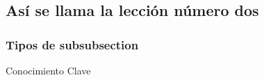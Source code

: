 \subsection{As\'i se llama la lección número dos}


\begin{opening}\blindtext\end{opening}
\subsubsection{Tipos de subsubsection}
\Blindtext
\begin{important}[0.65\textwidth]{Conocimiento Clave}
    \blindtext
\end{important}
\Blindtext

\begin{closing}
    \blindtext
\end{closing}

\begin{problemas}
    \Blindenumerate[2]
\end{problemas}